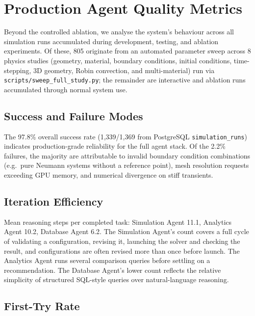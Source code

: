 \documentclass[preprint,review,12pt]{elsarticle}
\newif\ifrevisionsvisible
\newcommand{\revised}[1]{%
  \ifrevisionsvisible\textcolor{revisionred}{#1}\else#1\fi}
\begin{document}
\section{Production Agent Quality Metrics}
\label{sec:metrics}

Beyond the controlled ablation, we analyse the system's behaviour across all
simulation runs accumulated during development, testing, and ablation
experiments.  Of these, 805 originate from an automated parameter sweep across 8 physics
studies (geometry, material, boundary conditions, initial conditions,
time-stepping, 3D geometry, Robin convection, and multi-material) run via
\texttt{scripts/sweep\_full\_study.py}; the remainder are interactive and
ablation runs accumulated through normal system use.



\subsection{Success and Failure Modes}

The 97.8\% overall success rate (1{,}339/1{,}369 from PostgreSQL
\texttt{simulation\_runs}) indicates production-grade reliability
for the full agent stack.  Of the 2.2\% failures, the majority are attributable to invalid boundary condition
combinations (e.g.\ pure Neumann systems without a reference point), mesh
resolution requests exceeding GPU memory, and numerical divergence on
stiff transients.

\subsection{Iteration Efficiency}

\revised{Mean reasoning steps per completed task: Simulation Agent 11.1,
Analytics Agent 10.2, Database Agent 6.2.  The Simulation Agent's count
covers a full cycle of validating a configuration, revising it, launching
the solver and checking the result, and configurations are often revised
more than once before launch.  The Analytics Agent runs several
comparison queries before settling on a recommendation.}  The Database
Agent's lower count reflects the relative simplicity of structured
SQL-style queries over natural-language reasoning.

\subsection{First-Try Rate}
\end{document}
